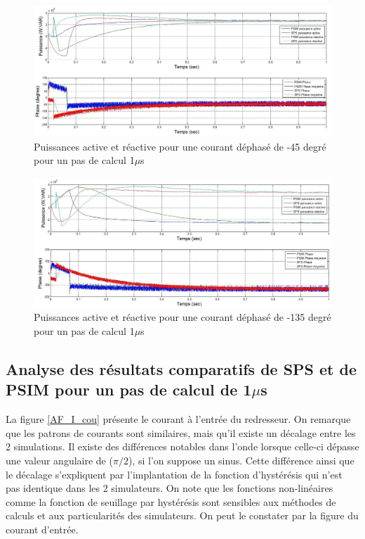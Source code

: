 \begin{figure}[htb]
\centering
\includegraphics[scale=0.5]{fig/AFEIDEAL/pui_45.jpg}
\caption{Puissances active et réactive pour une courant déphasé de -45 degré pour un pas de calcul 1$\mu$s}
\label{AF_I_pui__45}
\end{figure}

\begin{figure}[htb]
\centering
\includegraphics[scale=0.5]{fig/AFEIDEAL/pui_135.jpg}
\caption{Puissances active et réactive pour une courant déphasé de -135 degré pour un pas de calcul 1$\mu$s}
\label{AF_I_pui__135}
\end{figure}


\clearpage

\subsection{Analyse des résultats comparatifs de SPS et de PSIM pour un pas de calcul de 1$\mu$s}
La figure \ref{AF_I_cou} présente le courant à l'entrée du redresseur. On remarque que les patrons de courants sont similaires, mais qu'il existe un décalage entre les 2 simulations. Il existe des différences notables dans l'onde lorsque celle-ci dépasse une valeur angulaire de ($\pi/2$), si l'on suppose un sinus. Cette différence ainsi que le décalage s'expliquent par l'implantation de la fonction d'hystérésis qui n'est pas identique dans les 2 simulateurs. On note que les fonctions non-linéaires comme la fonction de seuillage par hystérésis sont sensibles aux méthodes de calculs et aux particularités des simulateurs. On peut le constater par la figure du courant d'entrée.

